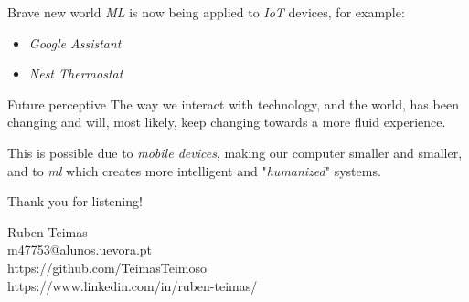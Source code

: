 \documentclass[dvipsnames, handout]{beamer}
\newcommand{\1}{\mathds{1}}	%
\begin{document}
\begin{frame}{Brave new world}
\emph{ML} is now being applied to \emph{IoT} devices, for example:
\begin{itemize}
    \item \emph{Google Assistant}
    \item \emph{Nest Thermostat}
\end{itemize}
\end{frame}

\begin{frame}{Future perceptive}
The way we interact with technology, and the world, has been changing and will, most likely, keep changing towards a more fluid experience. 

This is possible due to \emph{mobile devices}, making our computer smaller and smaller, and to \emph{ml} which creates more intelligent and "\emph{humanized}" systems.
\end{frame}


\begin{frame}
\begin{center}
{\large\color{titleText} Thank you for listening!}
\vspace{1cm}

Ruben Teimas\\[1em]
m47753@alunos.uevora.pt \\
https://github.com/TeimasTeimoso \\
https://www.linkedin.com/in/ruben-teimas/
\end{center}
\end{frame}

\end{document}
